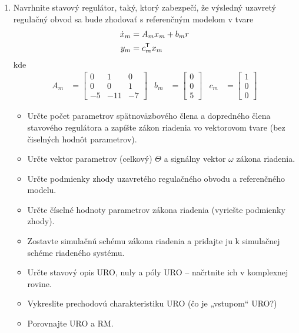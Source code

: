 \documentclass[a4paper, 10pt, ]{article}
\begin{document}
\begin{enumerate}[leftmargin=0pt, labelsep=4mm, itemsep=0pt]
    \item Navrhnite stavový regulátor, taký, ktorý zabezpečí, že výsledný uzavretý regulačný obvod sa bude zhodovať s referenčným modelom v tvare
    \begin{subequations} \label{refmodelcv}
    \begin{align}
    	 \dot x_m &= A_m x_m + b_m r \\
    	 y_m &= c_m^{\mathsf{T}} x_m
    \end{align}
    \end{subequations}
    kde
    \begin{align*}
        A_m
        &=
        \begin{bmatrix}
        		0 & 1 & 0 \\
        		0 & 0 & 1 \\
        		-5 & -11 & -7
        \end{bmatrix}
        &
        b_m &= \begin{bmatrix} 0 \\ 0 \\ 5 \end{bmatrix}
        &
        c_m &= \begin{bmatrix} 1 \\ 0 \\ 0 \end{bmatrix}
    \end{align*}

    \begin{itemize}[leftmargin=0pt, labelsep=4mm, itemsep=0pt]
        \item Určte počet parametrov spätnoväzbového člena a dopredného člena stavového regulátora a zapíšte zákon riadenia vo vektorovom tvare (bez čiselných hodnôt parametrov).
        \item Určte vektor parametrov (celkový) $\Theta$ a signálny vektor $\omega$ zákona riadenia.
        \item Určte podmienky zhody uzavretého regulačného obvodu a referenčného modelu.
        \item Určte číselné hodnoty parametrov zákona riadenia (vyriešte podmienky zhody).
        \item Zostavte simulačnú schému zákona riadenia a pridajte ju k simulačnej schéme riadeného systému.
        \item Určte stavový opis URO, nuly a póly URO -- načrtnite ich v komplexnej rovine.
        \item Vykreslite prechodovú charakteristiku URO (čo je „vstupom“ URO?)
        \item Porovnajte URO a RM.
    \end{itemize}








\end{enumerate}
\end{document}
